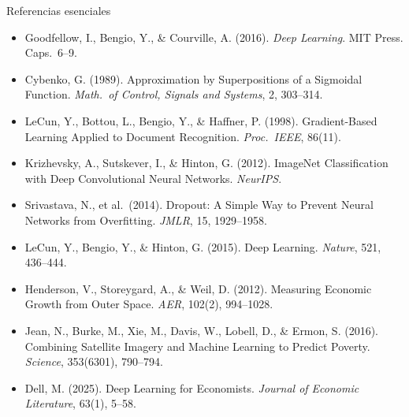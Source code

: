 \documentclass{beamer}
\newcommand{\1}{\mathbb{I}}
\begin{document}
\begin{frame}{Referencias esenciales}
\footnotesize
\begin{itemize}\itemsep2pt
  \item Goodfellow, I., Bengio, Y., \& Courville, A. (2016). \emph{Deep Learning}. MIT Press. Caps.\ 6--9.
  \item Cybenko, G. (1989). Approximation by Superpositions of a Sigmoidal Function. \emph{Math.\ of Control, Signals and Systems}, 2, 303--314.
  \item LeCun, Y., Bottou, L., Bengio, Y., \& Haffner, P. (1998). Gradient-Based Learning Applied to Document Recognition. \emph{Proc.\ IEEE}, 86(11).
  \item Krizhevsky, A., Sutskever, I., \& Hinton, G. (2012). ImageNet Classification with Deep Convolutional Neural Networks. \emph{NeurIPS}.
  \item Srivastava, N., et al.\ (2014). Dropout: A Simple Way to Prevent Neural Networks from Overfitting. \emph{JMLR}, 15, 1929--1958.
  \item LeCun, Y., Bengio, Y., \& Hinton, G. (2015). Deep Learning. \emph{Nature}, 521, 436--444.
  \item Henderson, V., Storeygard, A., \& Weil, D. (2012). Measuring Economic Growth from Outer Space. \emph{AER}, 102(2), 994--1028.
  \item Jean, N., Burke, M., Xie, M., Davis, W., Lobell, D., \& Ermon, S. (2016). Combining Satellite Imagery and Machine Learning to Predict Poverty. \emph{Science}, 353(6301), 790--794.
  \item Dell, M. (2025). Deep Learning for Economists. \emph{Journal of Economic Literature}, 63(1), 5--58.
\end{itemize}
\normalsize
\end{frame}

\end{document}
